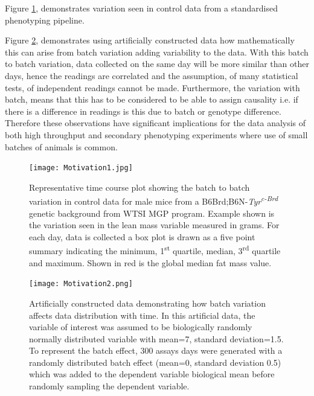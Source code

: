 \documentclass[12pt,a4paper]{article}
\begin{document}
Figure \ref{fig:001}, demonstrates variation seen in control data from a standardised phenotyping pipeline. 

Figure \ref{fig:002}, demonstrates using artificially constructed data how mathematically this can arise from batch variation adding variability to the data. With this batch to batch variation, data collected on the same day will be more similar than other days, hence the readings are correlated and the assumption, of many statistical tests, of independent readings cannot be made.  Furthermore, the variation with batch, means that this has to be considered to be able to assign causality i.e. if there is a difference in readings is this due to batch or genotype difference.  Therefore these observations have significant implications for the data analysis of both high throughput and secondary phenotyping experiments where use of small batches of animals is common. 

\begin{figure}[!htpb]%
\centerline{\texttt{[image: Motivation1.jpg]}}
\caption{Representative time course plot showing the batch to batch variation in control data for male mice from a B6Brd;B6N-\textit{Tyr\textsuperscript{c-Brd}} genetic background from WTSI MGP program. Example shown is the variation seen in the lean mass variable measured in grams.   For each day, data is collected a box plot is drawn as a five point summary indicating the minimum, 1\textsuperscript{st} quartile, median, 3\textsuperscript{rd} quartile and maximum. Shown in red is the global median fat mass value.}\label{fig:001}
\end{figure}

\begin{figure}[!htpb]%
\centerline{\texttt{[image: Motivation2.png]}}
\caption{Artificially constructed data demonstrating how batch variation affects data distribution with time.  In this artificial data, the variable of interest was assumed to be biologically randomly normally distributed variable with mean=7, standard deviation=1.5. To represent the batch effect, 300 assays days were generated with a randomly distributed batch effect (mean=0, standard deviation 0.5) which was added to the dependent variable biological mean before randomly sampling the dependent variable. }\label{fig:002}
\end{figure}
\end{document}
